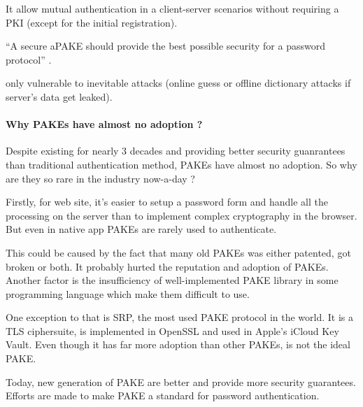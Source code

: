 \documentclass[../report.tex]{subfiles}
\begin{document}
It allow mutual authentication in a client-server scenarios without requiring a PKI (except for the initial registration).

``A secure aPAKE should provide the best possible security for a password protocol'' \cite{OPAQUE_Standard_Draft}.

only vulnerable to inevitable attacks (online guess or offline dictionary attacks if server's data get leaked).

\paragraph{Why PAKEs have almost no adoption ?}






Despite existing for nearly 3 decades and providing better security guanrantees than traditional authentication method, PAKEs have almost no adoption. So why are they so rare in the industry now-a-day ?

Firstly, for web site, it's easier to setup a password form and handle all the processing on the server than to implement complex cryptography in the browser. But even in native app PAKEs are rarely used to authenticate.

This could be caused by the fact that many old PAKEs was either patented, got broken or both. %
It probably hurted the reputation and adoption of PAKEs.
Another factor is the insufficiency of well-implemented PAKE library in some programming language %
which make them difficult to use.

One exception to that is SRP, the most used PAKE protocol in the world. %
 It is a TLS ciphersuite, is implemented in OpenSSL and used in Apple's iCloud Key Vault. Even though it has far more adoption than other PAKEs, is not the ideal PAKE.


Today, new generation of PAKE are better and provide more security guarantees. Efforts are made to make PAKE a standard for password authentication. %



\end{document}
